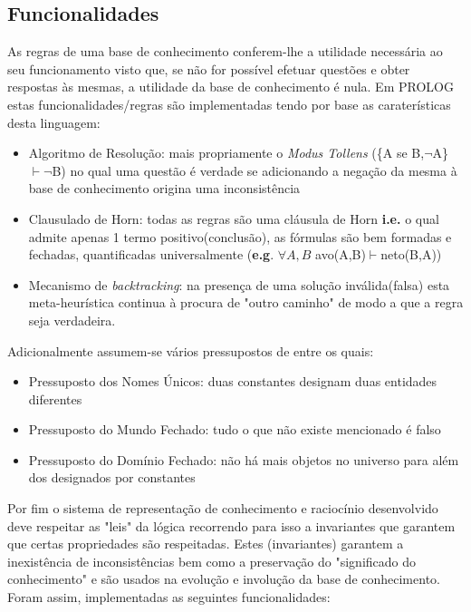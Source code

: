 \documentclass{article}
\begin{document}
\subsection{Funcionalidades}
As regras de uma base de conhecimento conferem-lhe a utilidade necessária ao seu funcionamento visto que, se não for possível efetuar questões e obter respostas às mesmas, a utilidade da base de conhecimento é nula. Em PROLOG estas funcionalidades/regras são implementadas tendo por base as caraterísticas desta linguagem:
\begin{itemize} 
	\item Algoritmo de Resolução: mais propriamente o \textit{Modus Tollens} (\{A se B,$\neg$A\}$\vdash\neg$B) no qual uma questão é verdade se adicionando a negação da mesma à base de conhecimento origina uma inconsistência
    \item Clausulado de Horn: todas as regras são uma cláusula de Horn \textbf{i.e.} o qual admite apenas 1 termo positivo(conclusão), as fórmulas são bem formadas e fechadas, quantificadas universalmente (\textbf{e.g}. $\forall{A,B}$ avo(A,B)$\vdash$neto(B,A))
    \item Mecanismo de \textit{backtracking}: na presença de uma solução inválida(falsa) esta meta-heurística continua à procura de "outro caminho" de modo a que a regra seja verdadeira.
\end{itemize}
Adicionalmente assumem-se vários pressupostos de entre os quais:
\begin{itemize}
	\item Pressuposto dos Nomes Únicos: duas constantes designam duas entidades diferentes
    \item Pressuposto do Mundo Fechado: tudo o que não existe mencionado é falso
    \item Pressuposto do Domínio Fechado: não há mais objetos no universo para além dos designados por constantes
\end{itemize}
Por fim o sistema de representação de conhecimento e raciocínio desenvolvido deve respeitar as "leis" da lógica recorrendo para isso a invariantes que garantem que certas propriedades são respeitadas. Estes (invariantes) garantem a inexistência de inconsistências bem como a preservação do "significado do conhecimento" e são usados na evolução e involução da base de conhecimento.
\newline
Foram assim, implementadas as seguintes funcionalidades:
\end{document}
